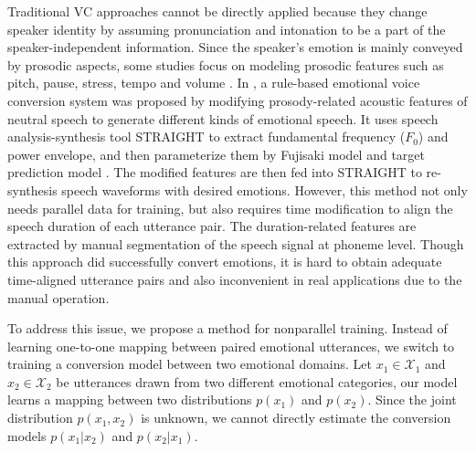 \documentclass{article}
\begin{document}
Traditional VC approaches cannot be directly applied because they change speaker identity by assuming pronunciation and intonation to be a part of the speaker-independent information. Since the speaker's emotion is mainly conveyed by prosodic aspects, some studies focus on modeling prosodic features such as pitch, pause, stress, tempo and volume \cite{wang2012emotional, li2012emotional, wang2014multi}. In \cite{xue2018voice}, a rule-based emotional voice conversion system was proposed by modifying prosody-related acoustic features of neutral speech to generate different kinds of emotional speech. It uses speech analysis-synthesis tool STRAIGHT \cite{kawahara1999restructuring} to extract fundamental frequency ($F_0$) and power envelope, and then parameterize them by Fujisaki model \cite{fujisaki1984analysis} and target prediction model \cite{xue2016study}. The modified features are then fed into STRAIGHT to re-synthesis speech waveforms with desired emotions. However, this method not only needs parallel data for training, but also requires time modification to align the speech duration of each utterance pair. The duration-related features are extracted by manual segmentation of the speech signal at phoneme level. Though this approach did successfully convert emotions, it is hard to obtain adequate time-aligned utterance pairs and also inconvenient in real applications due to the manual operation.

To address this issue, we propose a method for nonparallel training. Instead of learning one-to-one mapping between paired emotional utterances, we switch to training a conversion model between two emotional domains. Let $x_1 \in \mathcal{X}_1$ and $x_2 \in \mathcal{X}_2$ be utterances drawn from two different emotional categories, our model learns a mapping between two distributions $p(x_1)$ and $p(x_2)$. Since the joint distribution $p(x_1, x_2)$ is unknown, we cannot directly estimate the conversion models $p(x_1|x_2)$ and $p(x_2|x_1)$.
\end{document}
